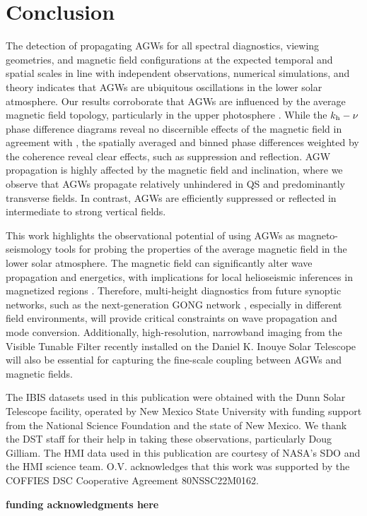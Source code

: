 \documentclass[preprint2,linenumbers]{aastex701}
\begin{document}
\section{Conclusion} \label{sec:conclusion}

The detection of propagating AGWs for all spectral diagnostics, viewing geometries, and magnetic field configurations at the expected temporal and spatial scales in line with independent observations, numerical simulations, and theory indicates that AGWs are ubiquitous oscillations in the lower solar atmosphere.
Our results corroborate that AGWs are influenced by the average magnetic field topology, particularly in the upper photosphere \citep{2009_Newington_Cally, 2017_Vigeesh}.
While the $k_{\rm{h}}-\nu$ phase difference diagrams reveal no discernible effects of the magnetic field in agreement with \citet{2020_Vigeesh_Roth}, the spatially averaged and binned phase differences weighted by the coherence reveal clear effects, such as suppression and reflection.
AGW propagation is highly affected by the magnetic field and inclination, where we observe that AGWs propagate relatively unhindered in QS and predominantly transverse fields.
In contrast, AGWs are efficiently suppressed or reflected in intermediate to strong vertical fields.

This work highlights the observational potential of using AGWs as magneto-seismology tools for probing the properties of the average magnetic field in the lower solar atmosphere.
The magnetic field can significantly alter wave propagation and energetics, with implications for local helioseismic inferences in magnetized regions \citep{2013_Cally_Moradi, 2016_Hague_Erdelyi}.
Therefore, multi-height diagnostics from future synoptic networks, such as the next-generation GONG network \citep[ngGONG;][]{2019_Hill_ngGONG}, especially in different field environments, will provide critical constraints on wave propagation and mode conversion.
Additionally, high-resolution, narrowband imaging from the Visible Tunable Filter \citep[VTF;][]{2012_Kentischer} recently installed on the Daniel K. Inouye Solar Telescope \citep[DKIST;][]{2020_Rimmele_DKIST, 2021_Rast_DKIST} will also be essential for capturing the fine-scale coupling between AGWs and magnetic fields.

\begin{acknowledgments}
The IBIS datasets used in this publication were obtained with the Dunn Solar Telescope facility, operated by New Mexico State University with funding support from the National Science Foundation and the state of New Mexico. We thank the DST staff for their help in taking these observations, particularly Doug Gilliam. The HMI data used in this publication are courtesy of NASA's SDO and the HMI science team. O.V. acknowledges that this work was supported by the COFFIES DSC Cooperative Agreement 80NSSC22M0162.

\textbf{funding acknowledgments here}
\end{acknowledgments}



{}

\end{document}
